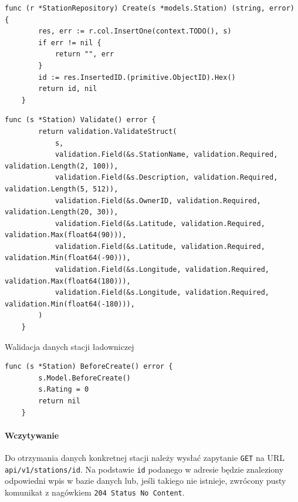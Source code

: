 \begin{lstlisting}[label=list:repo_create_station,caption=Dodanie wpisu stacji ładowniczej do bazy danych,basicstyle=\tiny\ttfamily]
    func (r *StationRepository) Create(s *models.Station) (string, error) {
        res, err := r.col.InsertOne(context.TODO(), s)
        if err != nil {
            return "", err
        }
        id := res.InsertedID.(primitive.ObjectID).Hex()
        return id, nil
    }
\end{lstlisting}

\begin{lstlisting}[label=list:before_create_station,caption=Walidacja danych stacji ładowniczej,basicstyle=\tiny\ttfamily]
    func (s *Station) Validate() error {
        return validation.ValidateStruct(
            s,
            validation.Field(&s.StationName, validation.Required, validation.Length(2, 100)),
            validation.Field(&s.Description, validation.Required, validation.Length(5, 512)),
            validation.Field(&s.OwnerID, validation.Required, validation.Length(20, 30)),
            validation.Field(&s.Latitude, validation.Required, validation.Max(float64(90))),
            validation.Field(&s.Latitude, validation.Required, validation.Min(float64(-90))),
            validation.Field(&s.Longitude, validation.Required, validation.Max(float64(180))),
            validation.Field(&s.Longitude, validation.Required, validation.Min(float64(-180))),
        )
    }
\end{lstlisting}Walidacja danych stacji ładowniczej

\begin{lstlisting}[label=list:validation_station,caption=Uzupełnienie danych systemowych dotyczących,basicstyle=\tiny\ttfamily]
    func (s *Station) BeforeCreate() error {
        s.Model.BeforeCreate()
        s.Rating = 0
        return nil
    }
\end{lstlisting}

\paragraph{Wczytywanie}
Do otrzymania danych konkretnej stacji należy wysłać zapytanie \texttt{GET} na URL \texttt{api/v1/stations/{id}}. Na podstawie \texttt{id} podanego w adresie będzie znaleziony odpowiedni wpis w bazie danych lub, jeśli takiego nie istnieje, zwrócony pusty komunikat z nagówkiem \texttt{204 Status No Content}.

